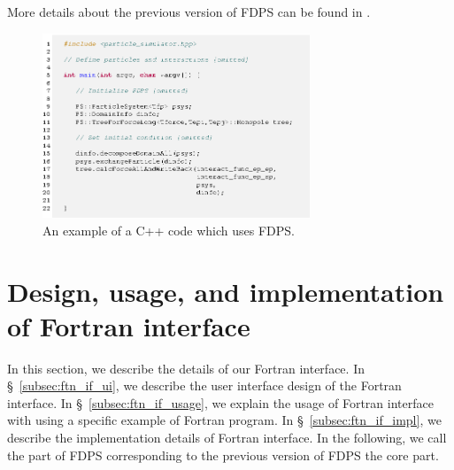 \documentclass[twocolumn,useamsfonts]{pasj01}
\begin{document}
More details about the previous version of FDPS can be found in \citet{iwasawa16:_implem_fdps}.

\begin{figure}[h]
\begin{center}
\includegraphics[width=8cm]{figures/src_cpp_smpl}
\end{center}
\caption{An example of a C++ code which uses FDPS. }
\label{fig:src_cpp_smpl}  
\end{figure}


\section{Design, usage, and implementation of Fortran interface}
\label{sec:design_implementation}
In this section, we describe the details of our Fortran interface. In \S~\ref{subsec:ftn_if_ui}, we describe the user interface design of the Fortran interface. In \S~\ref{subsec:ftn_if_usage}, we explain the usage of Fortran interface with using a specific example of Fortran program. In \S~\ref{subsec:ftn_if_impl}, we describe the implementation details of Fortran interface. In the following, we call the part of FDPS corresponding to the previous version of FDPS the core part.

\end{document}
